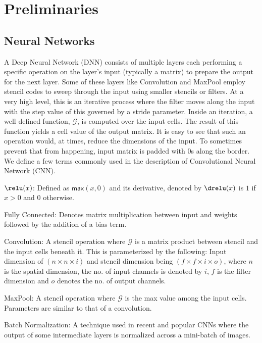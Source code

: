 \section{Preliminaries}\label{subsec:preliminaries}

\subsection{Neural Networks} A Deep Neural Network (DNN) consists of multiple layers each performing a specific operation on the layer's input (typically a matrix) to prepare the output for the next layer. Some of these layers like Convolution and MaxPool employ stencil codes to sweep through the input using smaller stencils or filters. At a very high level, this is an iterative process where the filter moves along the input with the step value of this governed by a stride parameter. Inside an iteration, a well defined function, $\mathcal{G}$, is computed over the input cells. The result of this function yields a cell value of the output matrix. It is easy to see that such an operation would, at times, reduce the dimensions of the input. To sometimes prevent that from happening, input matrix is padded with 0s along the border. We define a few terms commonly used in the description of Convolutional Neural Network (CNN).
\begin{tiret}
\item $\relu(x)$: Defined as $\mathsf{max}(x,0)$ and its derivative, denoted by $\drelu(x)$ is $1$ if $x>0$ and $0$ otherwise.
\item \textsf{Fully Connected:} Denotes matrix multiplication between input and weights followed by the addition of a bias term.
\item \textsf{Convolution:} A stencil operation where $\mathcal{G}$ is a matrix product between stencil and the input cells beneath it. This is parameterized by the following: Input dimension of $(n\times n\times i)$ and stencil dimension being $(f\times f\times i\times o)$, where $n$ is the spatial dimension, the no. of input channels is denoted by $i$, $f$ is the filter dimension and $o$ denotes the no. of output channels.
\item \textsf{MaxPool:} A stencil operation where $\mathcal{G}$ is the max value among the input cells. Parameters are similar to that of a convolution.
\item \textsf{Batch Normalization:} A technique used in recent and popular CNNs where the output of some intermediate layers is normalized across a mini-batch of images.
\end{tiret}

